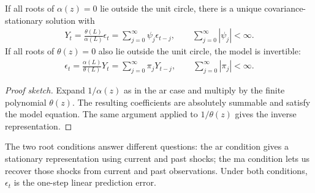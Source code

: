 \documentclass[a4paper,12pt]{article}
\begin{document}
\begingroup
{}
\begin{proposition}
	If all roots of $\alpha(z)=0$ lie outside the unit circle, there is a unique
	covariance-stationary solution with
	\begin{align}\label{eq-arma-linear}
		Y_t=\frac{\theta(L)}{\alpha(L)}\epsilon_t
		=\sum_{j=0}^{\infty}\psi_j\epsilon_{t-j},\qquad
		\sum_{j=0}^{\infty}|\psi_j|<\infty.
	\end{align}
	If all roots of $\theta(z)=0$ also lie outside the unit circle, the model is invertible:
	\begin{align}
		\epsilon_t=\frac{\alpha(L)}{\theta(L)}Y_t
		=\sum_{j=0}^{\infty}\pi_jY_{t-j},\qquad
		\sum_{j=0}^{\infty}|\pi_j|<\infty.
	\end{align}
\end{proposition}
\endgroup
\begin{proof}[Proof sketch]
	Expand $1/\alpha(z)$ as in the \gls{ar} case and multiply by the finite polynomial $\theta(z)$.
	The resulting coefficients are absolutely summable and satisfy the model equation.
	The same argument applied to $1/\theta(z)$ gives the inverse representation.
\end{proof}

\begin{remark}
	The two root conditions answer different questions:
	the \gls{ar} condition gives a stationary representation using current and past shocks;
	the \gls{ma} condition lets us recover those shocks from current and past observations.
	Under both conditions, $\epsilon_t$ is the one-step linear prediction error.
\end{remark}

\end{document}
